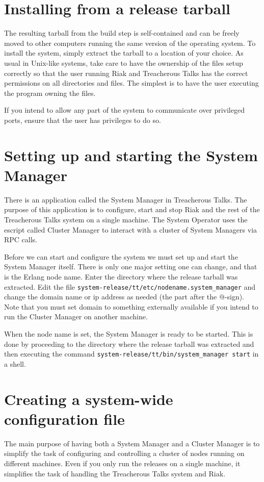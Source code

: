 \documentclass[11pt,a4paper]{report}
\begin{document}
\section{Installing from a release tarball}
\label{sec:installing}
The resulting tarball from the build step is self-contained and can be freely
moved to other computers running the same version of the operating system. To
install the system, simply extract the tarball to a location of your choice. As
usual in Unix-like systems, take care to have the ownership of the files setup
correctly so that the user running Riak and Treacherous Talks has the correct
permissions on all directories and files. The simplest is to have the user
executing the program owning the files.

If you intend to allow any part of the system to communicate over privileged
ports, ensure that the user has privileges to do so.
\section{Setting up and starting the System Manager}
\label{sec:settingup}
There is an application called the System Manager in Treacherous Talks. The
purpose of this application is to configure, start and stop Riak and the rest of
the Treacherous Talks system on a single machine. The System Operator uses the
escript called Cluster Manager to interact with a cluster of System Managers via
RPC calls.

\begin{sloppypar}
Before we can start and configure the system we must set up and start the System
Manager itself. There is only one major setting one can change, and that is the
Erlang node name. Enter the directory where the release tarball was extracted.
Edit the file {\tt system-release/tt/etc/nodename.system\_manager} and change
the domain name or ip address as needed (the part after the @-sign). Note that
you must set domain to something externally available if you intend to run the
Cluster Manager on another machine.
\end{sloppypar}

\begin{sloppypar}
When the node name is set, the System Manager is ready to be started. This is
done by proceeding to the directory where the release tarball was extracted and
then executing the command {\tt system-release/tt/bin/system\_manager start} in
a shell.
\end{sloppypar}
\section{Creating a system-wide configuration file}
The main purpose of having both a System Manager and a Cluster Manager is to
simplify the task of configuring and controlling a cluster of nodes running on
different machines. Even if you only run the releases on a single machine, it
simplifies the task of handling the Treacherous Talks system and Riak.
\end{document}
